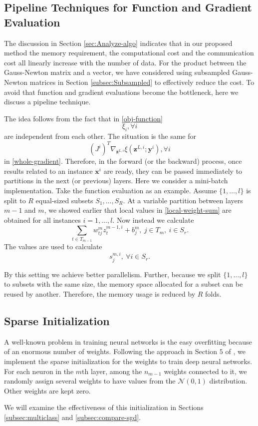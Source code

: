 \documentclass[12pt]{article}
\def\bx{{\boldsymbol x}}
\def\by{{\boldsymbol y}}
\def\bz{{\boldsymbol z}}
\begin{document}
\subsection{Pipeline Techniques for Function and Gradient Evaluation}
\label{subsec:pipeline}
The discussion in Section \ref{sec:Analyze-algo} indicates that in our proposed method the memory requirement, the computational cost and the communication cost all linearly
increase with the number of data. For the product between the Gauss-Newton matrix and a vector, we have considered using subsampled Gauss-Newton matrices in Section \ref{subsec:Subsampled}
to effectively reduce the cost. To avoid that function and gradient evaluations become the bottleneck, here we discuss a pipeline technique.
\par The idea follows from the fact that in \eqref{obj-function} 
\begin{equation*}
    \xi_i, \forall i
\end{equation*}
are independent from each other. The situation is the same for 
\begin{equation*}
(J^i)^T\nabla_{\bz^{L,i}}\xi(\bz^{L,i};\by^i), \forall i
\end{equation*}
in \eqref{whole-gradient}. Therefore, in the forward (or the backward) process, once results related to an instance $\bx^i$ are ready,
they can be passed immediately to partitions in the next (or previous) layers. Here we consider a mini-batch implementation. Take the function evaluation as an example.
Assume $\{1,\ldots,l\}$ is split to $R$ equal-sized subsets $S_1,\ldots,S_R$.
At a variable partition between layers $m-1$ and $m$, we showed earlier that local values in \eqref{local-weight-sum} are obtained for all instances $i=1,\ldots,l$. 
Now instead we calculate
\begin{equation*}
\sum_{t \in T_{m-1}} w_{tj}^m z^{m-1,i}_t + b^m_j,\ j \in T_m,\ i \in S_r.
\end{equation*}
The values are used to calculate
\begin{equation*}
s^{m,i}_j,\ \forall i \in S_r.
\end{equation*}
\par By this setting we achieve better parallelism. Further, because we split $\{1,\ldots,l\}$ to subsets with the same size, the memory space allocated
for a subset can be reused by another. Therefore, the memory usage is reduced by $R$ folds.

\subsection{Sparse Initialization}
\label{subsec:Sparse-Init}
A well-known problem in training neural networks is the easy overfitting because of an enormous number of weights. 
Following the approach in Section $5$ of \cite{JM10a}, we implement the sparse initialization for the weights to train deep neural networks. 
For each neuron in the $m$th layer, 
among the $n_{m-1}$ weights connected to it, we randomly assign several weights to have values from the $\mathcal{N}(0,1)$ distribution. Other weights are kept zero.
\par We will examine the effectiveness of this initialization in Sections \ref{subsec:multiclass} and \ref{subsec:compare-sgd}.
\end{document}
